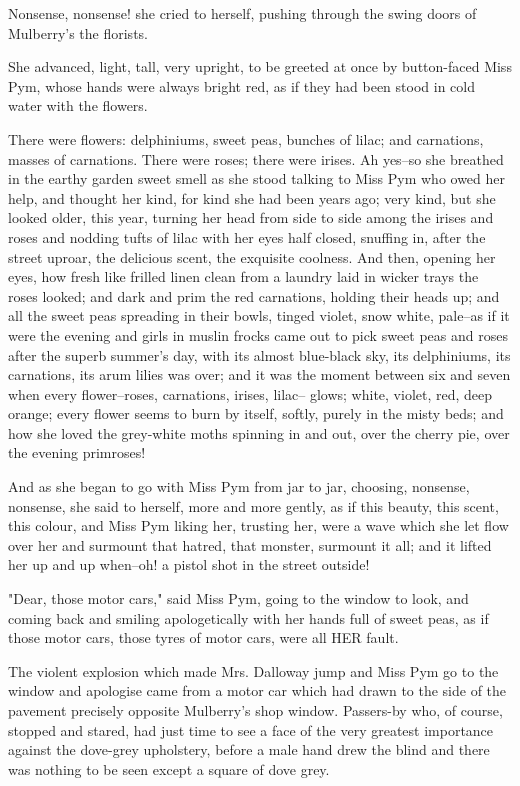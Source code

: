 \documentclass[lang=cn,10pt]{elegantbook}
\begin{document}
Nonsense, nonsense! she cried to herself, pushing through the swing
doors of Mulberry's the florists.

She advanced, light, tall, very upright, to be greeted at once by
button-faced Miss Pym, whose hands were always bright red, as if
they had been stood in cold water with the flowers.

There were flowers: delphiniums, sweet peas, bunches of lilac; and
carnations, masses of carnations.  There were roses; there were
irises.  Ah yes--so she breathed in the earthy garden sweet smell
as she stood talking to Miss Pym who owed her help, and thought her
kind, for kind she had been years ago; very kind, but she looked
older, this year, turning her head from side to side among the
irises and roses and nodding tufts of lilac with her eyes half
closed, snuffing in, after the street uproar, the delicious scent,
the exquisite coolness.  And then, opening her eyes, how fresh like
frilled linen clean from a laundry laid in wicker trays the roses
looked; and dark and prim the red carnations, holding their heads
up; and all the sweet peas spreading in their bowls, tinged violet,
snow white, pale--as if it were the evening and girls in muslin
frocks came out to pick sweet peas and roses after the superb
summer's day, with its almost blue-black sky, its delphiniums, its
carnations, its arum lilies was over; and it was the moment between
six and seven when every flower--roses, carnations, irises, lilac--
glows; white, violet, red, deep orange; every flower seems to burn
by itself, softly, purely in the misty beds; and how she loved the
grey-white moths spinning in and out, over the cherry pie, over the
evening primroses!

And as she began to go with Miss Pym from jar to jar, choosing,
nonsense, nonsense, she said to herself, more and more gently, as
if this beauty, this scent, this colour, and Miss Pym liking her,
trusting her, were a wave which she let flow over her and surmount
that hatred, that monster, surmount it all; and it lifted her up
and up when--oh! a pistol shot in the street outside!

"Dear, those motor cars," said Miss Pym, going to the window to
look, and coming back and smiling apologetically with her hands
full of sweet peas, as if those motor cars, those tyres of motor
cars, were all HER fault.



The violent explosion which made Mrs. Dalloway jump and Miss Pym go
to the window and apologise came from a motor car which had drawn
to the side of the pavement precisely opposite Mulberry's shop
window.  Passers-by who, of course, stopped and stared, had just
time to see a face of the very greatest importance against the
dove-grey upholstery, before a male hand drew the blind and there
was nothing to be seen except a square of dove grey.
\end{document}
